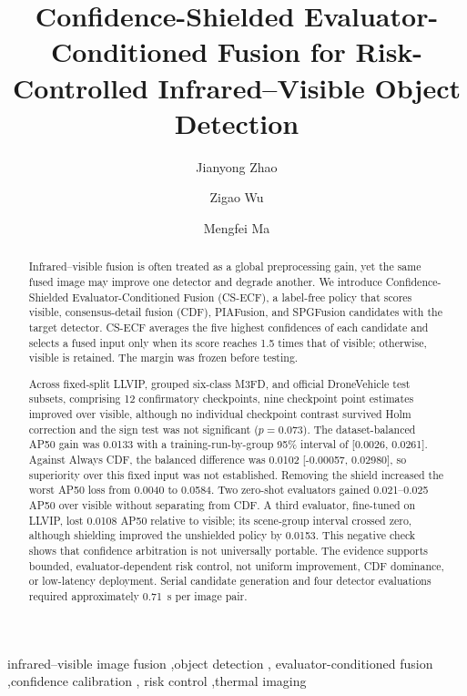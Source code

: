 \documentclass[preprint,11pt]{elsarticle}
\begin{document}
\sloppy

\begin{frontmatter}

\title{Confidence-Shielded Evaluator-Conditioned Fusion for Risk-Controlled Infrared--Visible Object Detection}

\author[AUTHOR]{Jianyong Zhao}

\author[AUTHOR]{Zigao Wu}

\author[AUTHOR]{Mengfei Ma}


\begin{abstract}
Infrared--visible fusion is often treated as a global preprocessing gain, yet
the same fused image may improve one detector and degrade another. We introduce
Confidence-Shielded Evaluator-Conditioned Fusion (CS-ECF), a label-free policy
that scores visible, consensus-detail fusion (CDF), PIAFusion, and SPGFusion
candidates with the target detector. CS-ECF averages the five highest
confidences of each candidate and selects a fused input only when its score
reaches 1.5 times that of visible; otherwise, visible is retained. The margin
was frozen before testing.

Across fixed-split LLVIP, grouped six-class M3FD, and official DroneVehicle test
subsets, comprising 12 confirmatory checkpoints, nine checkpoint point
estimates improved over visible, although no individual checkpoint contrast
survived Holm correction and the sign test was not significant (\(p=0.073\)).
The dataset-balanced AP50 gain was 0.0133 with a
training-run-by-group 95\% interval of [0.0026, 0.0261]. Against Always CDF, the
balanced difference was 0.0102 [-0.00057, 0.02980], so superiority over this
fixed input was not established. Removing the shield increased the worst AP50
loss from 0.0040 to 0.0584. Two zero-shot evaluators gained 0.021--0.025 AP50
over visible without separating from CDF. A third evaluator, fine-tuned on
LLVIP, lost 0.0108 AP50 relative to visible; its scene-group interval crossed
zero, although shielding improved the unshielded policy by 0.0153. This negative
check shows that confidence arbitration is not universally portable. The
evidence supports bounded, evaluator-dependent risk control, not uniform
improvement, CDF dominance, or low-latency deployment. Serial candidate
generation and four detector evaluations required approximately
\SI{0.71}{s} per image pair.
\end{abstract}

\begin{keyword}
infrared--visible image fusion \sep object detection \sep
evaluator-conditioned fusion \sep confidence calibration \sep
risk control \sep thermal imaging
\end{keyword}

\end{frontmatter}
\end{document}
